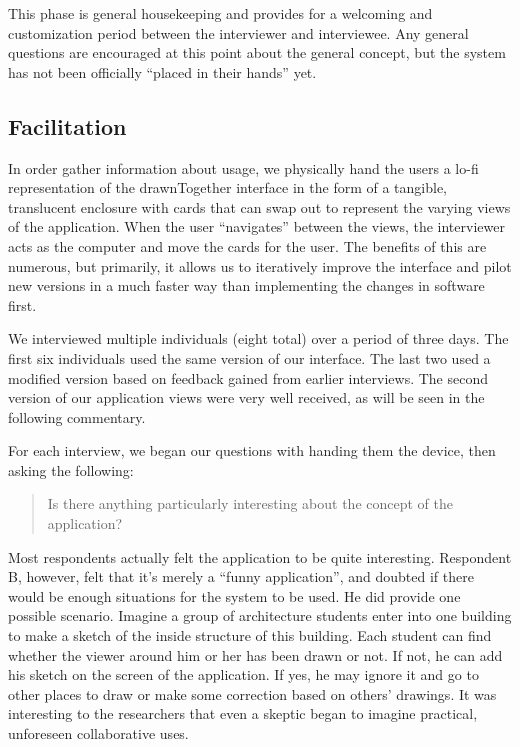 \documentclass{chi2009}
\begin{document}
This phase is general housekeeping and provides for a welcoming and
customization period between the interviewer and interviewee.  Any general
questions are encouraged at this point about the general concept, but the
system has not been officially ``placed in their hands'' yet.

\subsection{Facilitation}

In order gather information about usage, we physically hand the users a
lo-fi representation of the drawnTogether interface in the form of a tangible,
translucent enclosure with cards that can swap out to represent the varying
views of the application.  When the user ``navigates'' between the views, the
interviewer acts as the computer and move the cards for the user.  The
benefits of this are numerous, but primarily, it allows us to iteratively
improve the interface and pilot new versions in a much faster way than
implementing the changes in software first.

We interviewed multiple individuals (eight total) over a period of three days.
The first six individuals used the same version of our interface.  The last two
used a modified version based on feedback gained from earlier interviews.  The
second version of our application views were very well received, as will be
seen in the following commentary.

For each interview, we began our questions with handing them the device, then
asking the following:
\begin{quote}
Is there anything particularly interesting about the concept of the
application?
\end{quote}

Most respondents actually felt the application to be quite interesting.
Respondent B, however, felt that it's merely a ``funny application'', and doubted if
there would be enough situations for the system to be used.   He did provide
one possible  scenario. Imagine a group of architecture students
enter into one building to make a sketch of the inside structure of this
building. Each student can find whether the viewer around him or her has been
drawn or not. If not, he can add his sketch on the screen of the application.
If yes, he may ignore it and go to other places to draw or make some correction
based on others' drawings.  It was interesting to the researchers that even a
skeptic began to imagine practical, unforeseen collaborative uses.
\end{document}
